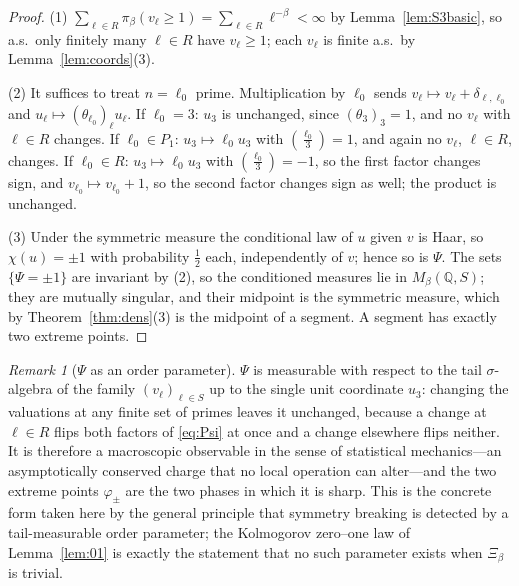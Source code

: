 \documentclass[11pt]{amsart}
\numberwithin{equation}{section}
\theoremstyle{definition}
\theoremstyle{remark}
\newtheorem{remark}[theorem]{Remark}
\newcommand{\Q}{\mathbb{Q}}
\newcommand{\Leg}[2]{\left(\frac{#1}{#2}\right)}
\begin{document}
\begin{proof}
(1) $\sum_{\ell\in R}\pi_\beta(v_\ell\ge1)=\sum_{\ell\in R}\ell^{-\beta}<\infty$
by Lemma~\ref{lem:S3basic}, so a.s.\ only finitely many $\ell\in R$ have
$v_\ell\ge1$; each $v_\ell$ is finite a.s.\ by Lemma~\ref{lem:coords}(3).

(2) It suffices to treat $n=\ell_0$ prime. Multiplication by $\ell_0$ sends
$v_\ell\mapsto v_\ell+\delta_{\ell,\ell_0}$ and $u_\ell\mapsto(\theta_{\ell_0})_\ell u_\ell$.
If $\ell_0=3$: $u_3$ is unchanged, since $(\theta_3)_3=1$, and no $v_\ell$ with
$\ell\in R$ changes. If $\ell_0\in P_1$: $u_3\mapsto\ell_0u_3$ with
$\Leg{\ell_0}{3}=1$, and again no $v_\ell$, $\ell\in R$, changes. If
$\ell_0\in R$: $u_3\mapsto\ell_0u_3$ with $\Leg{\ell_0}{3}=-1$, so the first
factor changes sign, and $v_{\ell_0}\mapsto v_{\ell_0}+1$, so the second factor
changes sign as well; the product is unchanged.

(3) Under the symmetric measure the conditional law of $u$ given $v$ is Haar, so
$\chi(u)=\pm1$ with probability $\tfrac12$ each, independently of $v$; hence so
is $\Psi$. The sets $\{\Psi=\pm1\}$ are invariant by (2), so the conditioned
measures lie in $M_\beta(\Q,S)$; they are mutually singular, and their midpoint
is the symmetric measure, which by Theorem~\ref{thm:dens}(3) is the midpoint of
a segment. A segment has exactly two extreme points.
\end{proof}

\begin{remark}[$\Psi$ as an order parameter]\label{rem:order}
$\Psi$ is measurable with respect to the tail $\sigma$-algebra of the family
$(v_\ell)_{\ell\in S}$ up to the single unit coordinate $u_3$: changing the valuations at
any finite set of primes leaves it unchanged, because a change at $\ell\in R$ flips both
factors of \eqref{eq:Psi} at once and a change elsewhere flips neither. It is therefore a
macroscopic observable in the sense of statistical mechanics---an asymptotically conserved
charge that no local operation can alter---and the two extreme points $\varphi_\pm$ are the
two phases in which it is sharp. This is the concrete form taken here by the general
principle that symmetry breaking is detected by a tail-measurable order parameter; the
Kolmogorov zero--one law of Lemma~\ref{lem:01} is exactly the statement that no such
parameter exists when $\Xi_\beta$ is trivial.
\end{remark}
\end{document}
